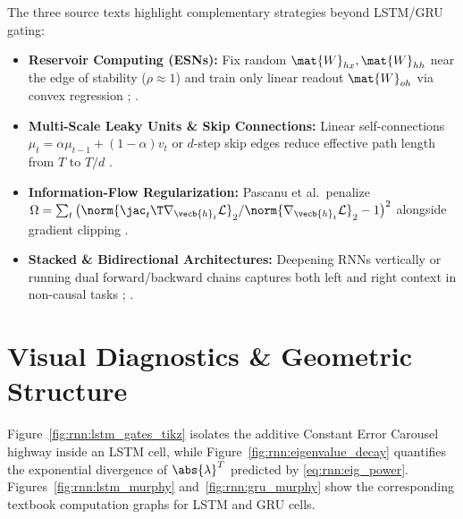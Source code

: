\documentclass[../../../../master.tex]{subfiles}
\begin{document}
\begin{crossbook}
The three source texts highlight complementary strategies beyond LSTM/GRU gating:
\begin{itemize}
  \item \textbf{Reservoir Computing (ESNs):} Fix random $\mat{W}_{hx}, \mat{W}_{hh}$ near the edge of stability ($\rho \approx 1$) and train only linear readout $\mat{W}_{oh}$ via convex regression ; .
  \item \textbf{Multi-Scale Leaky Units \& Skip Connections:} Linear self-connections $\mu_t = \alpha \mu_{t-1} + (1-\alpha)v_t$ or $d$-step skip edges reduce effective path length from $T$ to $T/d$ .
  \item \textbf{Information-Flow Regularization:} Pascanu et al.\ penalize $\Omega = \sum_t \big(\norm{\jac_t\T \nabla_{\vecb{h}_t}\mathcal{L}}_2 / \norm{\nabla_{\vecb{h}_t}\mathcal{L}}_2 - 1\big)^2$ alongside gradient clipping .
  \item \textbf{Stacked \& Bidirectional Architectures:} Deepening RNNs vertically or running dual forward/backward chains captures both left and right context in non-causal tasks ; .
\end{itemize}
\end{crossbook}

\section{Visual Diagnostics \& Geometric Structure}
\label{sec:rnn:visuals}

Figure~\ref{fig:rnn:lstm_gates_tikz} isolates the additive Constant Error Carousel highway inside an LSTM cell, while Figure~\ref{fig:rnn:eigenvalue_decay} quantifies the exponential divergence of $\abs{\lambda}^T$ predicted by \eqref{eq:rnn:eig_power}. Figures~\ref{fig:rnn:lstm_murphy} and~\ref{fig:rnn:gru_murphy} show the corresponding textbook computation graphs for LSTM and GRU cells.
\end{document}
